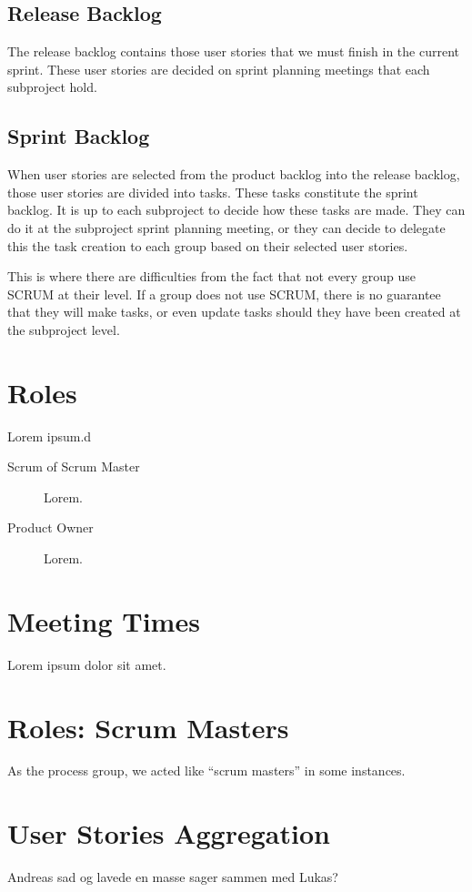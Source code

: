 \subsection{Release Backlog}
The release backlog contains those user stories that we must finish in the current sprint. These user stories are decided on sprint planning meetings that each subproject hold.

\subsection{Sprint Backlog}
When user stories are selected from the product backlog into the release backlog, those user stories are divided into tasks. These tasks constitute the sprint backlog. It is up to each subproject to decide how these tasks are made. They can do it at the subproject sprint planning meeting, or they can decide to delegate this the task creation to each group based on their selected user stories.

This is where there are difficulties from the fact that not every group use SCRUM at their level. If a group does not use SCRUM, there is no guarantee that they will make tasks, or even update tasks should they have been created at the subproject level.

\section{Roles}
Lorem ipsum.d

\begin{description}
  \item[Scrum of Scrum Master] Lorem.
  \item[Product Owner] Lorem.
\end{description}

\section{Meeting Times}
Lorem ipsum dolor sit amet.

\section{Roles: Scrum Masters}
As the process group, we acted like ``scrum masters'' in some instances.

\section{User Stories Aggregation}
Andreas sad og lavede en masse sager sammen med Lukas?

